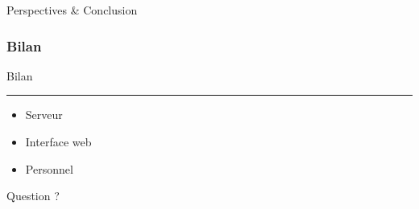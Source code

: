 \documentclass[t, english]{beamer}
\begin{document}
 \begin{frame}[c]

\begin{center}

\par
\Huge Perspectives \& Conclusion

\end{center}
  
\end{frame}

\begin{frame}[c]
  \frametitle{Bilan}
  
  \begin{minipage}{1\textwidth}
  	
\begin {center}
	\par
	\Huge Bilan
\end{center}
             
    \end{minipage}
   
   \hrule
  
  \begin{minipage}{1\textwidth}
    
         \begin{itemize}
     	    \item <1-> Serveur
     	    \item <2-> Interface web
	    \item <3-> Personnel
         \end{itemize}
   \end{minipage}
\end{frame}

\begin{frame}[c]

\begin{center}

\par
\Huge Question ?

\end{center}
\end{frame}
\end{document}
